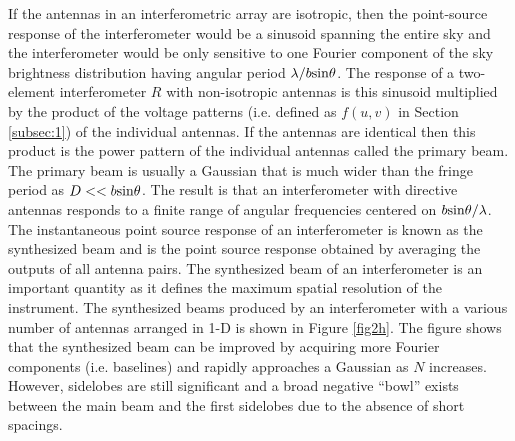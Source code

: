 If the antennas in an interferometric array are isotropic, then the  point-source response of the interferometer would be a sinusoid spanning the entire sky and the interferometer would be only sensitive to one Fourier component of the sky brightness distribution having angular period $\lambda/b\rm{sin}\theta$. The response of a two-element interferometer $R$ with non-isotropic antennas is this sinusoid multiplied by the product of the voltage patterns (i.e. defined as $f(u,v)$ in Section \ref{subsec:1}) of the individual antennas. If the antennas are identical then this product is the power pattern of the individual antennas called the primary beam. The primary beam is usually a Gaussian that is much wider than the fringe period as $D << b\rm{sin}\theta$. The result is that an interferometer with directive antennas responds to a finite range of angular frequencies centered on $b\rm{sin}\theta /\lambda$. The instantaneous point source response of an interferometer is known as the synthesized beam and is the point source response obtained by averaging the outputs of all antenna pairs. The synthesized beam of an interferometer is an important quantity as it defines the maximum spatial resolution of the instrument. The synthesized beams produced by an interferometer with a various number of antennas arranged in 1-D is shown in Figure \ref{fig2h}. The figure shows that the synthesized beam can be improved by acquiring more Fourier components (i.e. baselines) and rapidly approaches a Gaussian as $N$ increases. However, sidelobes are still significant and a broad negative ``bowl'' exists between the main beam and the first sidelobes due to the absence of short spacings.

